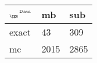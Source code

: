 \begin{tabular}{lll}
    \toprule
    $_{\text{\tiny{\ggn}}}$$^{\text{\tiny{Data}}}$ & mb & sub \\
    \midrule
    exact & 43
              & 309 \\
    mc   & 2015
              & 2865 \\
    \bottomrule
\end{tabular}